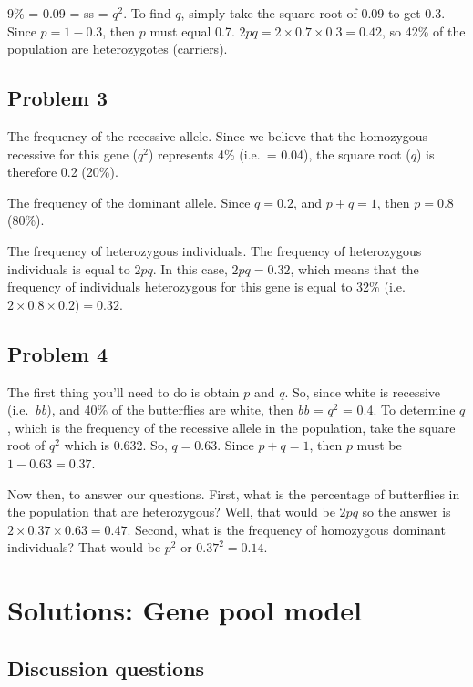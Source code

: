 \documentclass[
  a4paper]{book}
\begin{document}
9\% = 0.09 = ss = \(q^2\). To find \(q\), simply take the square root of 0.09 to get 0.3. Since \(p = 1 - 0.3\), then \(p\) must equal 0.7. \(2pq = 2 \times 0.7 \times 0.3 = 0.42\), so 42\% of the population are heterozygotes (carriers).

\hypertarget{problem-3}{%
\subsection{Problem 3}\label{problem-3}}

The frequency of the recessive allele. Since we believe that the homozygous recessive for this gene (\(q^2\)) represents 4\% (i.e.~= 0.04), the square root (\(q\)) is therefore 0.2 (20\%).

The frequency of the dominant allele. Since \(q = 0.2\), and \(p + q = 1\), then \(p = 0.8\) (80\%).

The frequency of heterozygous individuals. The frequency of heterozygous individuals is equal to \(2pq\). In this case, \(2pq = 0.32\), which means that the frequency of individuals heterozygous for this gene is equal to 32\% (i.e.~\(2 \times 0.8 \times 0.2) = 0.32\).

\hypertarget{problem-4}{%
\subsection{Problem 4}\label{problem-4}}

The first thing you'll need to do is obtain \(p\) and \(q\). So, since white is recessive (i.e.~\emph{bb}), and 40\% of the butterflies are white, then \emph{bb} = \(q^2\) = 0.4.
To determine \(q\), which is the frequency of the recessive allele in the population, take the square root of \(q^2\) which is 0.632. So, \(q = 0.63\). Since \(p + q = 1\), then \(p\) must be \(1 - 0.63 = 0.37\).

Now then, to answer our questions. First, what is the percentage of butterflies in the population that are heterozygous? Well, that would be \(2pq\) so the answer is \(2 \times 0.37\times 0.63 = 0.47\). Second, what is the frequency of homozygous dominant individuals? That would be \(p^2\) or \(0.37^2 = 0.14\).

\hypertarget{solutions-gene-pool-model}{%
\section{Solutions: Gene pool model}\label{solutions-gene-pool-model}}

\hypertarget{discussion-questions}{%
\subsection{Discussion questions}\label{discussion-questions}}
\end{document}
